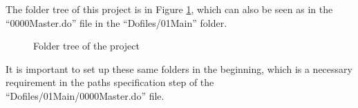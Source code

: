 \documentclass[12pt]{article}
\theoremstyle{definition}
\begin{document}
The folder tree of this project is in Figure \ref{ProjectTree}, which can also be seen as in the ``0000Master.do'' file in the ``Dofiles/01Main'' folder. 
\begin{figure}[H]
    \noindent\caption{Folder tree of the project}
    \vspace{-10pt}
    \begin{center}
        \label{ProjectTree}
    \end{center}
\end{figure}
It is important to set up these same folders in the beginning, which is a necessary requirement in the paths specification step of the ``Dofiles/01Main/0000Master.do'' file.
\end{document}
